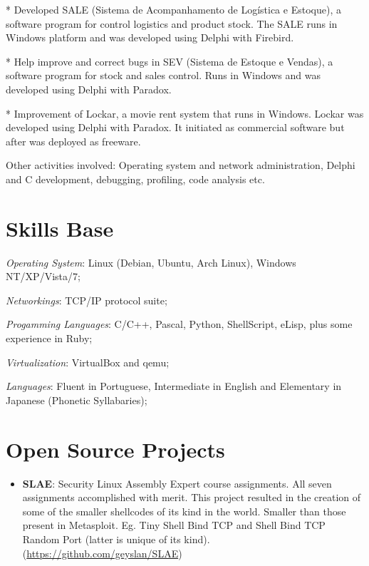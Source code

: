\documentclass[margin]{res}
\begin{document}
\begin{resume}
      * Developed SALE (Sistema de Acompanhamento de Logística e Estoque), a software program for control logistics and
        product stock. The SALE runs in Windows platform and was developed using Delphi with Firebird.

      * Help improve and correct bugs in SEV (Sistema de Estoque e Vendas), a software program for stock and sales control.
        Runs in Windows and was developed using Delphi with Paradox.

      * Improvement of Lockar, a movie rent system that runs in Windows. Lockar was developed using Delphi with Paradox.
        It initiated as commercial software but after was deployed as freeware.

      Other activities involved: Operating system and network administration, Delphi and C development, debugging, profiling,
      code analysis etc.

\section{Skills Base} \textit{Operating System}: Linux (Debian, Ubuntu, Arch Linux), Windows NT/XP/Vista/7;

			\textit{Networkings}: TCP/IP protocol suite;

			\textit{Progamming Languages}: C/C++, Pascal, Python, ShellScript, eLisp, plus some experience in Ruby;

			\textit{Virtualization}: VirtualBox and qemu;

			\textit{Languages}: Fluent in Portuguese, Intermediate in English and Elementary in Japanese (Phonetic
                                            Syllabaries);

\section{Open Source Projects}
		\begin{itemize}
		    \vspace{2mm}
                    \item \textbf{SLAE}: Security Linux Assembly Expert course assignments. All seven assignments accomplished with
                                         merit. This project resulted in the creation of some of the smaller shellcodes of its kind
                                         in the world. Smaller than those present in Metasploit. Eg. Tiny Shell Bind TCP and Shell Bind
                                         TCP Random Port (latter is unique of its kind).\newline
                                         (\url{https://github.com/geyslan/SLAE})\vspace{1mm}


\end{itemize}
\end{resume}
\end{document}
